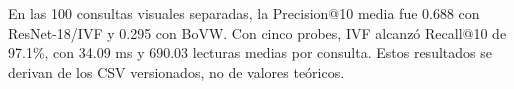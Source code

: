 En las 100 consultas visuales separadas, la Precision@10 media fue 0.688 con ResNet-18/IVF y 0.295 con BoVW. Con cinco probes, IVF alcanzó Recall@10 de 97.1\%, con 34.09 ms y 690.03 lecturas medias por consulta. Estos resultados se derivan de los CSV versionados, no de valores teóricos.
